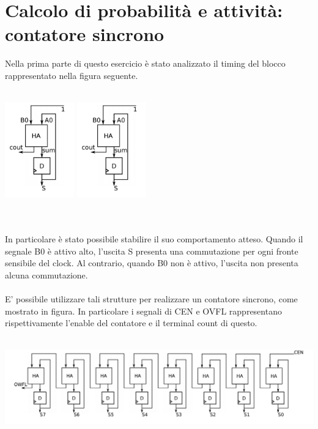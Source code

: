 \documentclass[11pt,  english, makeidx, a4paper, titlepage, oneside]{book}
\begin{document}
\section{Calcolo di probabilità e attività: contatore sincrono}
Nella prima parte di questo esercicio è stato analizzato il timing del blocco 
rappresentato nella figura seguente.
\\\\
\centerline{\includegraphics[width=3cm]{./img/Lab_1/Es_5/Sync_FA.png}
			\includegraphics[width=3cm]{./img/Lab_1/Es_5/Sync_FA.png}} %
\\\\
In particolare è stato possibile stabilire il suo comportamento atteso. 
Quando il segnale B0 è attivo alto, l'uscita S presenta una commutazione 
per ogni fronte sensibile del clock. Al contrario, quando B0 non è attivo, 
l'uscita non presenta alcuna commutazione.
\\\\
E' possibile utilizzare tali strutture per realizzare un contatore sincrono,
come mostrato in figura. In particolare i segnali di CEN e OVFL rappresentano
rispettivamente l'enable del contatore e il terminal count di questo.
\\\\
\centerline{\includegraphics[width=15cm]{./img/Lab_1/Es_5/Counter.png}}
\end{document}
